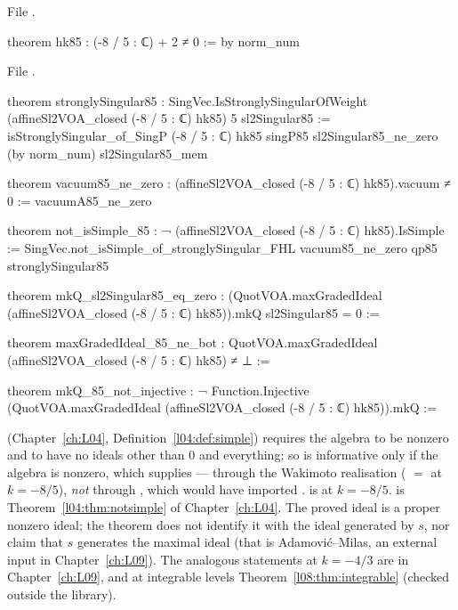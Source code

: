 \noindent File .
\begin{leancode}
theorem hk85 : (-8 / 5 : ℂ) + 2 ≠ 0 := by norm_num
\end{leancode}
\noindent File .
\begin{leancode}
theorem stronglySingular85 :
    SingVec.IsStronglySingularOfWeight (affineSl2VOA_closed (-8 / 5 : ℂ) hk85) 5 sl2Singular85 :=
  isStronglySingular_of_SingP (-8 / 5 : ℂ) hk85 singP85 sl2Singular85_ne_zero (by norm_num)
    sl2Singular85_mem

theorem vacuum85_ne_zero : (affineSl2VOA_closed (-8 / 5 : ℂ) hk85).vacuum ≠ 0 :=
  vacuumA85_ne_zero

theorem not_isSimple_85 : ¬ (affineSl2VOA_closed (-8 / 5 : ℂ) hk85).IsSimple :=
  SingVec.not_isSimple_of_stronglySingular_FHL vacuum85_ne_zero qp85 stronglySingular85

theorem mkQ_sl2Singular85_eq_zero :
    (QuotVOA.maxGradedIdeal (affineSl2VOA_closed (-8 / 5 : ℂ) hk85)).mkQ sl2Singular85 = 0 :=

theorem maxGradedIdeal_85_ne_bot :
    QuotVOA.maxGradedIdeal (affineSl2VOA_closed (-8 / 5 : ℂ) hk85) ≠ ⊥ :=

theorem mkQ_85_not_injective :
    ¬ Function.Injective
      (QuotVOA.maxGradedIdeal (affineSl2VOA_closed (-8 / 5 : ℂ) hk85)).mkQ :=
\end{leancode}

\begin{dictionary}
 (Chapter~\ref{ch:L04}, Definition~\ref{l04:def:simple}) requires the algebra to be
nonzero and to have no ideals other than $0$ and everything; so  is informative only
if the algebra is nonzero, which  supplies --- through the Wakimoto realisation
( $=$  at $k=-8/5$), \emph{not} through
, which would have imported .  is
 at $k=-8/5$. \allowbreak{}\allowbreak{}\allowbreak{}\allowbreak{}\allowbreak{} is
Theorem~\ref{l04:thm:notsimple} of Chapter~\ref{ch:L04}. The proved ideal is a proper nonzero ideal;
the theorem does not identify it with the ideal generated by $s$, nor claim that $s$ generates the
maximal ideal (that is Adamovi\'c--Milas, an external input in Chapter~\ref{ch:L09}). The analogous
statements at $k=-4/3$ are \allowbreak{}\allowbreak{}\allowbreak{} in Chapter~\ref{ch:L09}, and at integrable
levels Theorem~\ref{l08:thm:integrable} (checked outside the library).
\end{dictionary}

